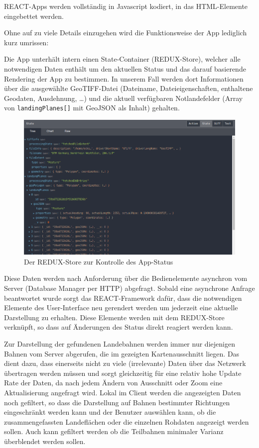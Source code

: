 \documentclass[10pt,a4paper]{report}
\begin{document}
REACT-Apps werden vollständig in Javascript kodiert, in das HTML-Elemente eingebettet werden. 

Ohne auf zu viele Details einzugehen wird die Funktionsweise der App lediglich kurz umrissen:

Die App unterhält intern einen State-Container (REDUX-Store), welcher alle notwendigen Daten enthält um den aktuellen Status und das darauf basierende Rendering der App zu bestimmen. In unserem Fall werden dort Informationen über die ausgewählte GeoTIFF-Datei (Dateiname, Dateieigenschaften, enthaltene Geodaten, Ausdehnung, \ldots) und die aktuell verfügbaren Notlandefelder (Array von \texttt{landingPlanes[]} mit GeoJSON als Inhalt) gehalten. 

\begin{figure}[ht]
	\includegraphics[width=\textwidth]{./drawings/ReduxStore_1.png}
	\caption{Der REDUX-Store zur Kontrolle des App-Status}
\end{figure}


Diese Daten werden nach Anforderung über die Bedienelemente asynchron vom Server (Database Manager per HTTP) abgefragt. Sobald eine asynchrone Anfrage beantwortet wurde sorgt das REACT-Framework dafür, dass die notwendigen Elemente des User-Interface neu gerendert werden um jederzeit eine aktuelle Darstellung zu erhalten. Diese Elemente werden mit dem REDUX-Store verknüpft, so dass auf Änderungen des Status direkt reagiert werden kann.

Zur Darstellung der gefundenen Landebahnen werden immer nur diejenigen Bahnen vom Server abgerufen, die im gezeigten Kartenausschnitt liegen. Das dient dazu, dass einerseits nicht zu viele (irrelevante) Daten über das Netzwerk übertragen werden müssen und sorgt gleichzeitig für eine relativ hohe Update Rate der Daten, da nach jedem Ändern von Ausschnitt oder Zoom eine Aktualisierung angefragt wird. Lokal im Client werden die angezeigten Daten noch gefiltert, so dass die Darstellung auf Bahnen bestimmter Richtungen eingeschränkt werden kann und der Benutzer auswählen kann, ob die zusammengefassten Landeflächen oder die einzelnen Rohdaten angezeigt werden sollen. Auch kann gefiltert werden ob die Teilbahnen minimaler Varianz überblendet werden sollen.
\end{document}
